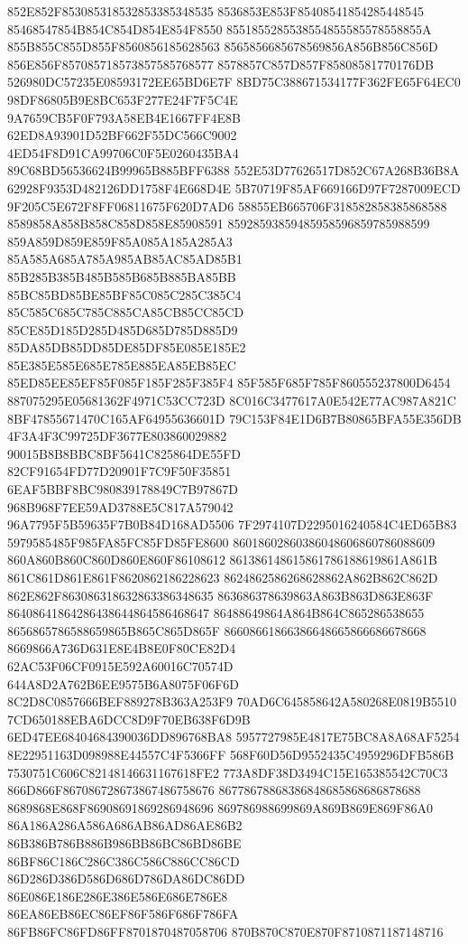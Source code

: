 852E852F853085318532853385348535
8536853E853F85408541854285448545
85468547854B854C854D854E854F8550
8551855285538554855585578558855A
855B855C855D855F8560856185628563
8565856685678569856A856B856C856D
856E856F857085718573857585768577
8578857C857D857F85808581770176DB
526980DC57235E08593172EE65BD6E7F
8BD75C388671534177F362FE65F64EC0
98DF86805B9E8BC653F277E24F7F5C4E
9A7659CB5F0F793A58EB4E1667FF4E8B
62ED8A93901D52BF662F55DC566C9002
4ED54F8D91CA99706C0F5E0260435BA4
89C68BD56536624B99965B885BFF6388
552E53D77626517D852C67A268B36B8A
62928F9353D482126DD1758F4E668D4E
5B70719F85AF669166D97F7287009ECD
9F205C5E672F8FF06811675F620D7AD6
58855EB665706F318582858385868588
8589858A858B858C858D858E85908591
85928593859485958596859785988599
859A859D859E859F85A085A185A285A3
85A585A685A785A985AB85AC85AD85B1
85B285B385B485B585B685B885BA85BB
85BC85BD85BE85BF85C085C285C385C4
85C585C685C785C885CA85CB85CC85CD
85CE85D185D285D485D685D785D885D9
85DA85DB85DD85DE85DF85E085E185E2
85E385E585E685E785E885EA85EB85EC
85ED85EE85EF85F085F185F285F385F4
85F585F685F785F860555237800D6454
887075295E05681362F4971C53CC723D
8C016C3477617A0E542E77AC987A821C
8BF47855671470C165AF64955636601D
79C153F84E1D6B7B80865BFA55E356DB
4F3A4F3C99725DF3677E803860029882
90015B8B8BBC8BF5641C825864DE55FD
82CF91654FD77D20901F7C9F50F35851
6EAF5BBF8BC980839178849C7B97867D
968B968F7EE59AD3788E5C817A579042
96A7795F5B59635F7B0B84D168AD5506
7F2974107D2295016240584C4ED65B83
5979585485F985FA85FC85FD85FE8600
86018602860386048606860786088609
860A860B860C860D860E860F86108612
861386148615861786188619861A861B
861C861D861E861F8620862186228623
8624862586268628862A862B862C862D
862E862F863086318632863386348635
863686378639863A863B863D863E863F
86408641864286438644864586468647
86488649864A864B864C865286538655
8656865786588659865B865C865D865F
86608661866386648665866686678668
8669866A736D631E8E4B8E0F80CE82D4
62AC53F06CF0915E592A60016C70574D
644A8D2A762B6EE9575B6A8075F06F6D
8C2D8C0857666BEF889278B363A253F9
70AD6C645858642A580268E0819B5510
7CD650188EBA6DCC8D9F70EB638F6D9B
6ED47EE68404684390036DD896768BA8
5957727985E4817E75BC8A8A68AF5254
8E22951163D098988E44557C4F5366FF
568F60D56D9552435C4959296DFB586B
7530751C606C82148146631167618FE2
773A8DF38D3494C15E165385542C70C3
866D866F867086728673867486758676
86778678868386848685868686878688
8689868E868F86908691869286948696
869786988699869A869B869E869F86A0
86A186A286A586A686AB86AD86AE86B2
86B386B786B886B986BB86BC86BD86BE
86BF86C186C286C386C586C886CC86CD
86D286D386D586D686D786DA86DC86DD
86E086E186E286E386E586E686E786E8
86EA86EB86EC86EF86F586F686F786FA
86FB86FC86FD86FF8701870487058706
870B870C870E870F8710871187148716

